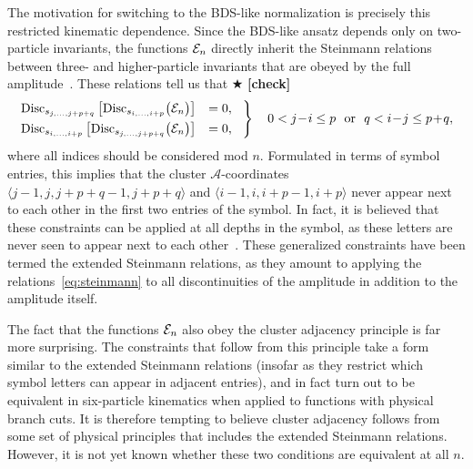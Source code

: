 \documentclass[12pt]{article}
\def\ket#1{\langle #1 \rangle}
\def\acoords{$\mathcal{A}$-coordinates}
\def\draftnote#1{{\color{red} $\bigstar$ }{\bf [#1]}}
\begin{document}
The motivation for switching to the BDS-like normalization is precisely this restricted kinematic dependence. Since the BDS-like ansatz depends only on two-particle invariants, the functions ${\cal E}_n$ directly inherit the Steinmann relations between three- and higher-particle invariants that are obeyed by the full amplitude~\cite{Steinmann,Steinmann2,Cahill:1973qp,Caron-Huot:2016owq,Dixon:2016nkn}. These relations tell us that \draftnote{check}
\begin{equation} \label{eq:steinmann}
\begin{rcases}
\text{Disc}_{s_{j,\dots,j+p+q}}\left[\text{Disc}_{s_{i,\dots,i+p}} \big({\cal E}_n \big) \right] &= 0, \hspace{.3cm} \\
\text{Disc}_{s_{i,\dots,i+p}}\left[\text{Disc}_{s_{j,\dots,j+p+q}} \big({\cal E}_n \big) \right] &= 0, 
\end{rcases} \quad 
\begin{gathered} 0 < j\!-\!i \leq p \text{\ \ or\ \ } q < i\!-\!j  \leq p\!+\!q, \end{gathered}
\end{equation}
where all indices should be considered mod $n$. Formulated in terms of symbol entries, this implies that the cluster \acoords\ $\ket{j-1,j,j+p+q-1,j+p+q}$ and $\ket{i-1,i,i+p-1,i+p}$ never appear next to each other in the first two entries of the symbol. In fact, it is believed that these constraints can be applied at all depths in the symbol, as these letters are never seen to appear next to each other~\cite{Caron-Huot:2016owq,Dixon:2016nkn,Caron-Huot:2018dsv,cosmic_galois_paper,all_orders_adjacency}. These generalized constraints have been termed the extended Steinmann relations, as they amount to applying the relations~\eqref{eq:steinmann} to all discontinuities of the amplitude in addition to the amplitude itself. 

The fact that the functions ${\cal E}_n$ also obey the cluster adjacency principle is far more surprising. The constraints that follow from this principle take a form similar to the extended Steinmann relations (insofar as they restrict which symbol letters can appear in adjacent entries), and in fact turn out to be equivalent in six-particle kinematics when applied to functions with physical branch cuts. It is therefore tempting to believe cluster adjacency follows from some set of physical principles that includes the extended Steinmann relations. However, it is not yet known whether these two conditions are equivalent at all $n$. 
\end{document}
